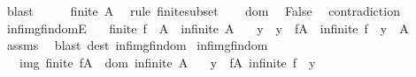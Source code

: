 \begin{isabellebody}
\ blast\isanewline
\ \ \isamarkupfalse%
\ \isamarkupfalse%
\ {\isachardoublequoteopen}finite\ A{\isachardoublequoteclose}\ \isamarkupfalse%
\ {\isacharparenleft}{\kern0pt}rule\ finite{\isacharunderscore}{\kern0pt}subset{\isacharparenright}{\kern0pt}\isanewline
\ \ \isamarkupfalse%
\ dom\ \isamarkupfalse%
\ False\ \isamarkupfalse%
\ contradiction\isanewline
{}\isamarkupfalse%
%
\endisatagproof
{\isafoldproof}%
%
\isadelimproof
\isanewline
%
\endisadelimproof
\isanewline
{}\isamarkupfalse%
\ inf{\isacharunderscore}{\kern0pt}img{\isacharunderscore}{\kern0pt}fin{\isacharunderscore}{\kern0pt}domE{\isacharprime}{\kern0pt}{\isacharcolon}{\kern0pt}\isanewline
\ \ \ {\isachardoublequoteopen}finite\ {\isacharparenleft}{\kern0pt}f\ {\isacharbackquote}{\kern0pt}\ A{\isacharparenright}{\kern0pt}{\isachardoublequoteclose}\ \ {\isachardoublequoteopen}infinite\ A{\isachardoublequoteclose}\isanewline
\ \ \ y\ \ {\isachardoublequoteopen}y\ {\isasymin}\ f{\isacharbackquote}{\kern0pt}A{\isachardoublequoteclose}\ \ {\isachardoublequoteopen}infinite\ {\isacharparenleft}{\kern0pt}f\ {\isacharminus}{\kern0pt}{\isacharbackquote}{\kern0pt}\ {\isacharbraceleft}{\kern0pt}y{\isacharbraceright}{\kern0pt}\ {\isasyminter}\ A{\isacharparenright}{\kern0pt}{\isachardoublequoteclose}\isanewline
%
\isadelimproof
\ \ %
\endisadelimproof
%
\isatagproof
{}\isamarkupfalse%
\ assms\ \isamarkupfalse%
\ {\isacharparenleft}{\kern0pt}blast\ dest{\isacharcolon}{\kern0pt}\ inf{\isacharunderscore}{\kern0pt}img{\isacharunderscore}{\kern0pt}fin{\isacharunderscore}{\kern0pt}dom{\isacharprime}{\kern0pt}{\isacharparenright}{\kern0pt}%
\endisatagproof
{\isafoldproof}%
%
\isadelimproof
\isanewline
%
\endisadelimproof
\isanewline
{}\isamarkupfalse%
\ inf{\isacharunderscore}{\kern0pt}img{\isacharunderscore}{\kern0pt}fin{\isacharunderscore}{\kern0pt}dom{\isacharcolon}{\kern0pt}\isanewline
\ \ \ img{\isacharcolon}{\kern0pt}\ {\isachardoublequoteopen}finite\ {\isacharparenleft}{\kern0pt}f{\isacharbackquote}{\kern0pt}A{\isacharparenright}{\kern0pt}{\isachardoublequoteclose}\ \ dom{\isacharcolon}{\kern0pt}\ {\isachardoublequoteopen}infinite\ A{\isachardoublequoteclose}\isanewline
\ \ \ {\isachardoublequoteopen}{\isasymexists}y\ {\isasymin}\ f{\isacharbackquote}{\kern0pt}A{\isachardot}{\kern0pt}\ infinite\ {\isacharparenleft}{\kern0pt}f\ {\isacharminus}{\kern0pt}{\isacharbackquote}{\kern0pt}\ {\isacharbraceleft}{\kern0pt}y{\isacharbraceright}{\kern0pt}{\isacharparenright}{\kern0pt}{\isachardoublequoteclose}\isanewline

\end{isabellebody}
